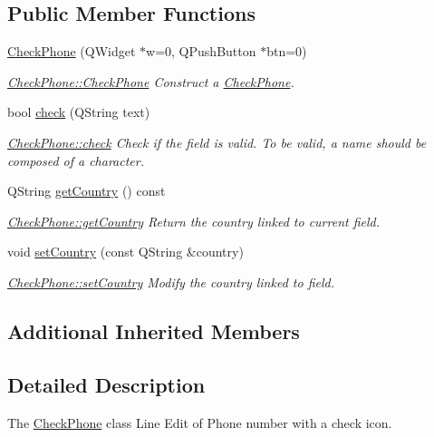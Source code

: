 \subsection*{Public Member Functions}
\begin{DoxyCompactItemize}
\item 
\hyperlink{classCheckPhone_a491bceb9add48e7668162fc8ec511550}{Check\+Phone} (Q\+Widget $\ast$w=0, Q\+Push\+Button $\ast$btn=0)
\begin{DoxyCompactList}\small\item\em \hyperlink{classCheckPhone_a491bceb9add48e7668162fc8ec511550}{Check\+Phone\+::\+Check\+Phone} Construct a \hyperlink{classCheckPhone}{Check\+Phone}. \end{DoxyCompactList}\item 
bool \hyperlink{classCheckPhone_ac60f1428fc89e1b2630db022e14509ed}{check} (Q\+String text)
\begin{DoxyCompactList}\small\item\em \hyperlink{classCheckPhone_ac60f1428fc89e1b2630db022e14509ed}{Check\+Phone\+::check} Check if the field is valid. To be valid, a name should be composed of a character. \end{DoxyCompactList}\item 
Q\+String \hyperlink{classCheckPhone_a3dd528db0e731b23df0524e41415d05e}{get\+Country} () const 
\begin{DoxyCompactList}\small\item\em \hyperlink{classCheckPhone_a3dd528db0e731b23df0524e41415d05e}{Check\+Phone\+::get\+Country} Return the country linked to current field. \end{DoxyCompactList}\item 
void \hyperlink{classCheckPhone_a2a4a30d0a69611f72c539cc17919ccc9}{set\+Country} (const Q\+String \&country)
\begin{DoxyCompactList}\small\item\em \hyperlink{classCheckPhone_a2a4a30d0a69611f72c539cc17919ccc9}{Check\+Phone\+::set\+Country} Modify the {\itshape country} linked to field. \end{DoxyCompactList}\end{DoxyCompactItemize}
\subsection*{Additional Inherited Members}


\subsection{Detailed Description}
The \hyperlink{classCheckPhone}{Check\+Phone} class Line Edit of Phone number with a check icon. 

